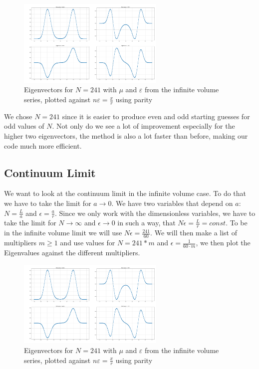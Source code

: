 \documentclass[11pt, letterpaper, onecolumn]{article}
\begin{document}
  	\begin{figure} [h] 
	\begin{center}
	\includegraphics[width=7cm]{"eigenvectors_Parity.png"}
	\caption{Eigenvectors for $N=241$ with $\mu$ and $\varepsilon$ from the infinite volume series, plotted against $n\varepsilon=\frac{x}{r}$ using parity}
	\end{center}
	\end{figure}
 	We chose $N=241$ since it is easier to produce even and odd starting guesses for odd values of $N$. Not only do we see a lot of improvement especially for the higher two eigenvectors, the method is also a lot faster than before, making our code much more efficient.
	\subsection{Continuum Limit}
    	We want to look at the continuum limit in the infinite volume case. To do that we have to take the limit for $a\rightarrow0$. We have two variables that depend on $a$: $N=\frac{L}{a}$ and $\epsilon=\frac{a}{r}$. Since we only work with the dimensionless variables, we have to take the limit for $N\rightarrow\infty$ and $\epsilon\rightarrow0$ in such a way, that $N\epsilon=\frac{L}{r}=const$. To be in the infinite volume limit we will use $N\epsilon=\frac{241}{60}$. We will then make a list of multipliers $m\geq1$ and use values for $N=241*m$ and $\epsilon=\frac{1}{60\cdot m}$, we then plot the Eigenvalues against the different multipliers.
	\begin{figure} [h] 
	\begin{center}
	\includegraphics[width=7cm]{"eigenvectors_Parity.png"}
	\caption{Eigenvectors for $N=241$ with $\mu$ and $\varepsilon$ from the infinite volume series, plotted against $n\varepsilon=\frac{x}{r}$ using parity}
	\end{center}
	\end{figure}
\end{document}
